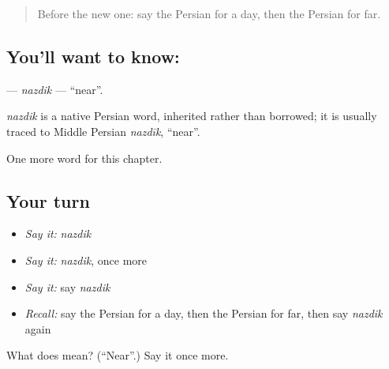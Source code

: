 \label{lesson:FA-C67-nazdik}



\begin{quote}
Before the new one: say the Persian for a day, then the Persian for far.
\end{quote}

\subsection*{You'll want to know: }
\textbf{} — \emph{nazdik} — \textquotedblleft{}near\textquotedblright{}.

\begin{cousinweb}
\emph{nazdik} is a native Persian word, inherited rather than borrowed; it is usually traced to Middle Persian \emph{nazdīk}, \textquotedblleft{}near\textquotedblright{}.
\end{cousinweb}

\begin{grammarlens}[title={What you've built}]
One more word for this chapter.
\end{grammarlens}

\subsection*{Your turn}
\begin{itemize}
\raggedright
  \item \emph{Say it:} \emph{nazdik}
  \item \emph{Say it:} \emph{nazdik}, once more
  \item \emph{Say it:} say \emph{nazdik}
  \item \emph{Recall:} say the Persian for a day, then the Persian for far, then say \emph{nazdik} again
\end{itemize}

\begin{tcolorbox}[breakable,colback=teal!4,colframe=teal!35!black,title={Before you move on}]
What does  mean? (\textquotedblleft{}Near\textquotedblright{}.) Say it once more.
\end{tcolorbox}
